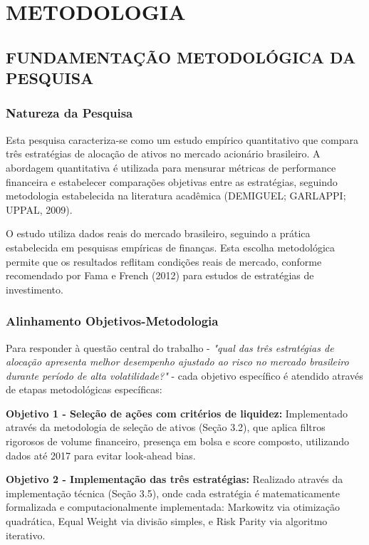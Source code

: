 
\chapter{METODOLOGIA}

\section{FUNDAMENTAÇÃO METODOLÓGICA DA PESQUISA}

\subsection{Natureza da Pesquisa}

Esta pesquisa caracteriza-se como um estudo empírico quantitativo que compara três estratégias de alocação de ativos no mercado acionário brasileiro. A abordagem quantitativa é utilizada para mensurar métricas de performance financeira e estabelecer comparações objetivas entre as estratégias, seguindo metodologia estabelecida na literatura acadêmica (DEMIGUEL; GARLAPPI; UPPAL, 2009).

O estudo utiliza dados reais do mercado brasileiro, seguindo a prática estabelecida em pesquisas empíricas de finanças. Esta escolha metodológica permite que os resultados reflitam condições reais de mercado, conforme recomendado por Fama e French (2012) para estudos de estratégias de investimento.

\subsection{Alinhamento Objetivos-Metodologia}

Para responder à questão central do trabalho - \textit{"qual das três estratégias de alocação apresenta melhor desempenho ajustado ao risco no mercado brasileiro durante período de alta volatilidade?"} - cada objetivo específico é atendido através de etapas metodológicas específicas:

\textbf{Objetivo 1 - Seleção de ações com critérios de liquidez:} Implementado através da metodologia de seleção de ativos (Seção 3.2), que aplica filtros rigorosos de volume financeiro, presença em bolsa e score composto, utilizando dados até 2017 para evitar look-ahead bias.

\textbf{Objetivo 2 - Implementação das três estratégias:} Realizado através da implementação técnica (Seção 3.5), onde cada estratégia é matematicamente formalizada e computacionalmente implementada: Markowitz via otimização quadrática, Equal Weight via divisão simples, e Risk Parity via algoritmo iterativo.

